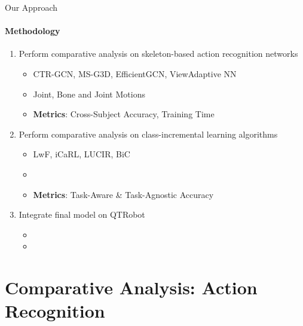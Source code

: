 \documentclass[aspectratio=169]{beamer}
\begin{document}
\begin{frame}{Our Approach}
      \framesubtitle{Methodology}%
      
      \begin{enumerate}
      \item Perform comparative analysis on skeleton-based action recognition networks
            \begin{itemize}
            \item CTR-GCN, MS-G3D, EfficientGCN, ViewAdaptive NN
            \item Joint, Bone and Joint Motions
            \item \textbf{Metrics}: Cross-Subject Accuracy, Training Time
            \end{itemize}
      \item Perform comparative analysis on class-incremental learning algorithms
            \begin{itemize}
            \item LwF, iCaRL, LUCIR, BiC
            \item 
            \item \textbf{Metrics}: Task-Aware \& Task-Agnostic Accuracy
            \end{itemize}
      \item Integrate final model on QTRobot
            \begin{itemize}
            \item 
            \item 
            \end{itemize}
      \end{enumerate}
\end{frame}

\section{Comparative Analysis: Action Recognition}
\end{document}

